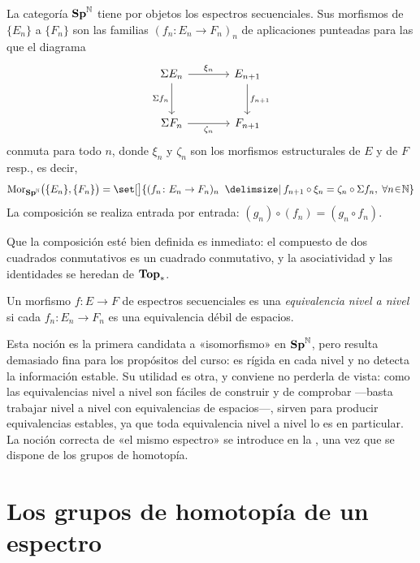 \begin{defi}\label{defi:spn}
La categoría $\mathbf{Sp}^{\mathbb{N}}$ tiene por objetos los espectros secuenciales. Sus morfismos de $\{E_n\}$ a $\{F_n\}$ son las familias $(f_n\colon E_n\to F_n)_n$ de aplicaciones punteadas para las que el diagrama
\[
\begin{tikzcd}[column sep=large, row sep=large]
\Sigma E_n \arrow[r,"\xi_n"] \arrow[d,"\Sigma f_n"'] & E_{n+1} \arrow[d,"f_{n+1}"]\\
\Sigma F_n \arrow[r,"\zeta_n"'] & F_{n+1}
\end{tikzcd}
\]
conmuta para todo $n$, donde $\xi_n$ y $\zeta_n$ son los morfismos estructurales de $E$ y de $F$ resp., es decir,
\[
\hom_{\Sp^{\mathbb{N}}}\bigl(\{E_n\},\{F_n\}\bigr)=
\set[\big]{(f_n\colon E_n \to F_n)_n\ \given f_{n+1} \circ \xi_n = \zeta_n \circ \Sigma f_n,\;\forall n\en\mathbb N }
\]
La composición se realiza entrada por entrada: $(g_n)\circ(f_n)=(g_n\circ f_n)$.
\end{defi}

Que la composición esté bien definida es inmediato: el compuesto de dos cuadrados conmutativos es un cuadrado conmutativo, y la asociatividad y las identidades se heredan de $\mathbf{Top}_*$.

\begin{defi}\label{defi:equiv-nivel}
Un morfismo $f\colon E\to F$ de espectros secuenciales es una \emph{equivalencia nivel a nivel} si cada $f_n\colon E_n\to F_n$ es una equivalencia débil de espacios.
\end{defi}

Esta noción es la primera candidata a «isomorfismo» en $\mathbf{Sp}^{\mathbb{N}}$, pero resulta demasiado fina para los propósitos del curso: es rígida en cada nivel y no detecta la información estable. Su utilidad es otra, y conviene no perderla de vista: como las equivalencias nivel a nivel son fáciles de construir y de comprobar ---basta trabajar nivel a nivel con equivalencias de espacios---, sirven para producir equivalencias estables, ya que toda equivalencia nivel a nivel lo es en particular. La noción correcta de «el mismo espectro» se introduce en la , una vez que se dispone de los grupos de homotopía.

\section{Los grupos de homotopía de un espectro}

